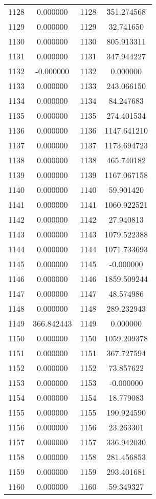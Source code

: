 \documentclass[12pt]{article}
\begin{document}
\begin{longtable}{@{}cccc@{}}
1128 & 0.000000 & 1128 & 351.274568 \\
1129 & 0.000000 & 1129 & 32.741650 \\
1130 & 0.000000 & 1130 & 805.913311 \\
1131 & 0.000000 & 1131 & 347.944227 \\
1132 & -0.000000 & 1132 & 0.000000 \\
1133 & 0.000000 & 1133 & 243.066150 \\
1134 & 0.000000 & 1134 & 84.247683 \\
1135 & 0.000000 & 1135 & 274.401534 \\
1136 & 0.000000 & 1136 & 1147.641210 \\
1137 & 0.000000 & 1137 & 1173.694723 \\
1138 & 0.000000 & 1138 & 465.740182 \\
1139 & 0.000000 & 1139 & 1167.067158 \\
1140 & 0.000000 & 1140 & 59.901420 \\
1141 & 0.000000 & 1141 & 1060.922521 \\
1142 & 0.000000 & 1142 & 27.940813 \\
1143 & 0.000000 & 1143 & 1079.522388 \\
1144 & 0.000000 & 1144 & 1071.733693 \\
1145 & 0.000000 & 1145 & -0.000000 \\
1146 & 0.000000 & 1146 & 1859.509244 \\
1147 & 0.000000 & 1147 & 48.574986 \\
1148 & 0.000000 & 1148 & 289.232943 \\
1149 & 366.842443 & 1149 & 0.000000 \\
1150 & 0.000000 & 1150 & 1059.209378 \\
1151 & 0.000000 & 1151 & 367.727594 \\
1152 & 0.000000 & 1152 & 73.857622 \\
1153 & 0.000000 & 1153 & -0.000000 \\
1154 & 0.000000 & 1154 & 18.779083 \\
1155 & 0.000000 & 1155 & 190.924590 \\
1156 & 0.000000 & 1156 & 23.263301 \\
1157 & 0.000000 & 1157 & 336.942030 \\
1158 & 0.000000 & 1158 & 281.456853 \\
1159 & 0.000000 & 1159 & 293.401681 \\
1160 & 0.000000 & 1160 & 59.349327 \\

\end{longtable}
\end{document}
